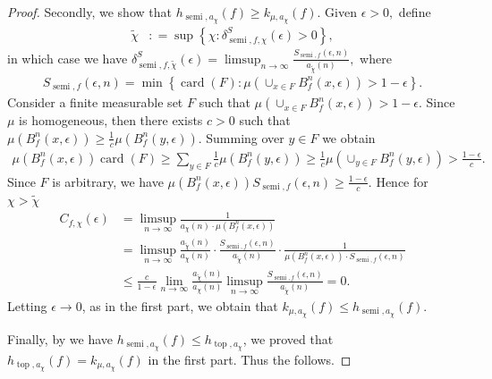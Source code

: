 \documentclass[oneside]{amsart}
\theoremstyle{plain}
\theoremstyle{definition}
\DeclareMathOperator{\card}{card}
\newcommand{\dfn}{\mathrel{\mathop:}=}
\newcommand{\<}{\langle}
\renewcommand{\>}{\rangle}
\newcommand{\e}{\epsilon}
\newcommand{\topo}{\operatorname{top}}
\renewcommand{\|}{|\!|} %
\newcommand{\semitop}{\operatorname{semi}} %
\begin{document}
\begin{proof}
Secondly, we show that $h_{\semitop, a_{\chi }} (f) \ge k_{\mu , a_{\chi }} (f).$ Given $\e >0,$  define 
  \begin{align*}
    \tilde{\chi }
    &\dfn \sup \left\{ \chi  : \delta_{\semitop,f,\chi} ^S (\e)  >0  \right\},
  \end{align*} 
  in which case we have $\displaystyle  \delta_{\semitop,f,\tilde{\chi }}^S (\e)  = \limsup _{n \to \infty } \frac{S_{\semitop,f} (\e , n)}{a_{\tilde{\chi }}(n)},$ where 
  \begin{align*}
    S_{\semitop,f} (\e ,n) = \min \left\{ \card (F) : \mu \left( \cup_{x \in F} B^n_f (x,\e ) \right) > 1- \e   \right\}.
  \end{align*} 
  Consider a finite measurable set $F$ such that $\mu \left( \cup_{x \in F} B^n_f (x,\e ) \right) > 1- \e .$
  Since $\mu $ is homogeneous, then there exists $c>0$  such that $\mu \left( B^n_f (x,\e ) \right) \ge \frac{1}{c} \mu \left( B^n_f (y,\e ) \right). $    Summing over $y \in F $ we obtain 
  \begin{align*}
    \mu \left( B^n_f (x,\e ) \right) \card (F)
    \ge \sum_{y \in F} \frac{1}{c} \mu \left( B^n_f (y,\e ) \right) 
    \ge \frac{1}{c} \mu \left( \cup_{y \in F}  B^n_f (y,\e )\right)  
    > \frac{1-\e }{c}.
  \end{align*} 
  Since $F$ is arbitrary, we have $\mu \left( B^n_f (x,\e ) \right) S_{\semitop,f} (\e ,n) \ge \frac{1-\e }{c} .$ Hence for $\chi > \tilde{\chi }$ 
  \begin{align*}
    C_{f, \chi} (\e ) 
    &= \limsup _{n \to \infty } \frac{1}{a_{\chi }(n) \cdot \mu \left( B^n_f (x, \e ) \right) }
    \\ 
    &= \limsup _{n \to \infty } \frac{a_{\tilde{\chi }} (n)}{a_{\chi }(n)} \cdot \frac{S_{\semitop,f} (\e , n)}{a_{\tilde{\chi }}(n)} \cdot  \frac{1}{ \mu \left( B^n_f (x, \e ) \right) \cdot S_{\semitop,f} (\e , n) } 
    \\ 
    & \le \frac{c}{1-\e }  \lim_{n \to \infty} \frac{a_{\tilde{\chi }} (n)}{a_{\chi }(n)} \limsup_{n \to \infty } \frac{S_{\semitop,f} (\e , n)}{a_{\tilde{\chi }}(n)} = 0.
  \end{align*}
  Letting $\e \to 0$, as in the first part, we obtain that  
  $k_{\mu ,a_{\chi }} (f) \le h_{\semitop, a_{\chi }} (f).$ 
   
  Finally, 
  by  
  we have $h_{\semitop, a_{\chi}} (f) \le h_{\topo, a_{\chi}}$, we proved that $h_{\topo,a_{\chi}} (f) = k_{\mu, a_{\chi}} (f)$ in the first part. Thus the  follows.
\end{proof}
\end{document}

